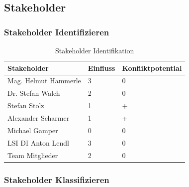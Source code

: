 \subsection{Stakeholder}
\subsubsection{Stakeholder Identifizieren}
\begin{table}[h]
	\centering
	\begin{tabular}{|lll|}
		\hline
		Stakeholder          & Einfluss &  Konfliktpotential      \\ \hline                         
		Mag. Helmut Hammerle & 3         & 0                  \\ 
		Dr. Stefan Walch     & 2         & 0                  \\
		Stefan Stolz         & 1         & +                  \\ 
		Alexander Scharmer   & 1         & +                  \\ 
		Michael Gamper       & 0         & 0                  \\ 
		LSI DI Anton Lendl   & 3         & 0                  \\ 
		Team Mitglieder      & 2         & 0                   \\ \hline			
	\end{tabular}
	\caption{Stakeholder Identifikation}
	\label{Tbl_Stakeholder_Identifikation}
\end{table}


\subsubsection{Stakeholder Klassifizieren}	

